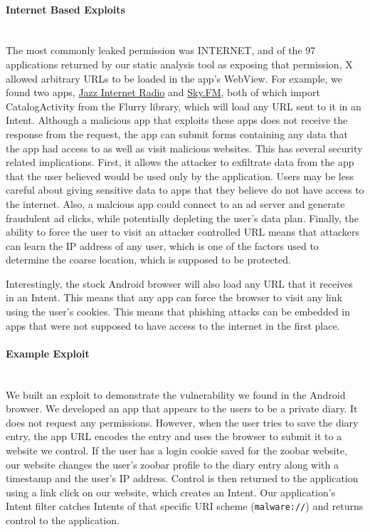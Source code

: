 \documentclass[12pt,a4paper]{article}
\begin{document}
\paragraph{Internet Based Exploits} ~\\
The most commonly leaked permission was INTERNET, and of the 97 applications
returned by our static analysis tool as exposing that permission, X allowed
arbitrary URLs to be loaded in the app's WebView. For example, we found two
apps,
\href{https://play.google.com/store/apps/details?id=com.audioaddict.jr\&feature=search\_result#?t=W251bGwsMSwxLDEsImNvbS5hdWRpb2FkZGljdC5qciJd}{Jazz
Internet Radio} and
\href{https://play.google.com/store/apps/details?id=com.audioaddict.sky\&feature=search\_result#?t=W251bGwsMSwxLDEsImNvbS5hdWRpb2FkZGljdC5za3kiXQ..}{Sky.FM},
both of which import CatalogActivity from the Flurry library, which will load
any URL sent to it in an Intent. Although a malicious app that exploits these
apps does not receive the response from the request, the app can submit forms
containing any data that the app had access to as well as visit malicious
websites. This has several security related implications. First, it allows the
attacker to exfiltrate data from the app that the user believed would be used
only by the application. Users may be less careful about giving sensitive data
to apps that they believe do not have access to the internet.  Also, a malcious
app could connect to an ad server and generate fraudulent ad clicks, while
potentially depleting the user's data plan.  Finally, the ability to force the
user to visit an attacker controlled URL means that attackers can learn the IP
address of any user, which is one of the factors used to determine the coarse
location, which is supposed to be protected.

Interestingly, the stock Android browser will also load any URL that it receives
in an Intent. This means that any app can force the browser to visit any link
using the user's cookies. This means that phishing attacks can be embedded in
apps that were not supposed to have access to the internet in the first place.

\paragraph{Example Exploit} ~\\
We built an exploit to demonstrate the vulnerability we found in the Android
browser. We developed an app that appears to the users to be a private diary. It
does not request any permissions. However, when the user tries to save the diary
entry, the app URL encodes the entry and uses the browser to submit it to a
website we control. If the user has a login cookie saved for the zoobar website,
our website changes the user's zoobar profile to the diary entry along with a
timestamp and the user's IP address. Control is then returned to the application
using a link click on our website, which creates an Intent. Our application's
Intent filter catches Intents of that specific URI scheme (\texttt{malware://})
and returns control to the application.
\end{document}
